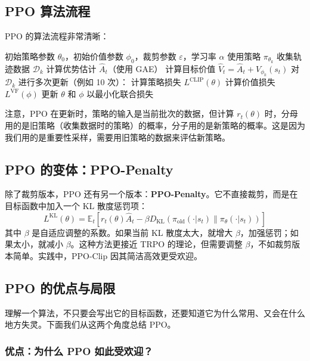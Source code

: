 \documentclass[lang=cn,zihao=-4,a4paper,fontset=windows]{beautybook}
\begin{document}
\subsection{PPO 算法流程}

PPO 的算法流程非常清晰：

\begin{algorithm}[H]
\caption{PPO-Clip 算法}
\begin{algorithmic}[1]
\REQUIRE 初始策略参数 $\theta_0$，初始价值参数 $\phi_0$，裁剪参数 $\varepsilon$，学习率 $\alpha$
    \STATE 使用策略 $\pi_{\theta_k}$ 收集轨迹数据 $\mathcal{D}_k$
    \STATE 计算优势估计 $\hat{A}_t$（使用 GAE）
    \STATE 计算目标价值 $\hat{V}_t = \hat{A}_t + V_{\phi_k}(s_t)$
    \STATE 对 $\mathcal{D}_k$ 进行多次更新（例如 10 次）：
        \STATE \quad 计算策略损失 $L^{\text{CLIP}}(\theta)$
        \STATE \quad 计算价值损失 $L^{\text{VF}}(\phi)$
        \STATE \quad 更新 $\theta$ 和 $\phi$ 以最小化联合损失
\ENDFOR
\end{algorithmic}
\end{algorithm}

注意，PPO 在更新时，策略的输入是当前批次的数据，但计算 \(r_t(\theta)\) 时，分母用的是旧策略（收集数据时的策略）的概率，分子用的是新策略的概率。这是因为我们用的是重要性采样，需要用旧策略的数据来评估新策略。

\subsection{PPO 的变体：PPO-Penalty}

除了裁剪版本，PPO 还有另一个版本：\textbf{PPO-Penalty}。它不直接裁剪，而是在目标函数中加入一个 KL 散度惩罚项：
\[
L^{\text{KL}}(\theta) = \mathbb{E}_t \left[ r_t(\theta) \hat{A}_t - \beta D_{\text{KL}}(\pi_{\text{old}}(\cdot|s_t) \| \pi_\theta(\cdot|s_t)) \right]
\]
其中 \(\beta\) 是自适应调整的系数。如果当前 KL 散度太大，就增大 \(\beta\)，加强惩罚；如果太小，就减小 \(\beta\)。这种方法更接近 TRPO 的理论，但需要调整 \(\beta\)，不如裁剪版本简单。实践中，PPO-Clip 因其简洁高效更受欢迎。

\subsection{PPO 的优点与局限}

理解一个算法，不只要会写出它的目标函数，还要知道它为什么常用、又会在什么地方失灵。下面我们从这两个角度总结 PPO。

\subsubsection{优点：为什么 PPO 如此受欢迎？}
\end{document}
